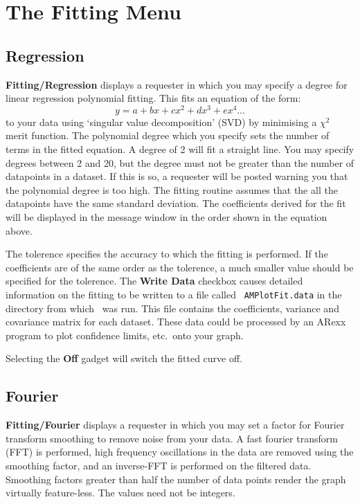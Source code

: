 \section{The Fitting Menu}


\subsection{Regression}
{\bf Fitting/Regression}  displays a requester in 
which you may specify a degree for linear regression polynomial fitting. 
This fits an equation of the form:
$$y=a+bx+cx^2+dx^3+ex^4\ldots$$
to your data using `singular value decomposition' (SVD) by minimising a $\chi^2$ 
merit function.
The polynomial degree which you specify sets the number of terms in 
the fitted equation. A degree of 2 will fit a straight line. You may specify 
degrees between 2 and 20, but the degree must not be greater than the number of 
datapoints in a dataset. If this is so, a requester will be posted warning you that 
the polynomial degree is too high.
The fitting routine assumes that the all the datapoints have the same
standard deviation. The coefficients derived for the fit will be displayed in the
message window in the order shown in the equation above.

The tolerence specifies the accuracy to which the fitting is performed. If 
the coefficients are of the same order as the tolerence, a much smaller 
value should be specified for the tolerence. The {\bf Write Data} checkbox 
causes detailed information on the fitting to be written to a file called 
{\tt
AMPlotFit.data} in the directory from which \amplot\ was run. This file contains the 
coefficients, variance and covariance matrix for each dataset. These data could be 
processed by an ARexx program to plot confidence limits, etc.\ onto your graph.

Selecting the {\bf Off} gadget will switch the fitted curve off.

\subsection{Fourier}
{\bf Fitting/Fourier}  
displays a requester in which you may set a 
factor for Fourier transform smoothing to remove noise from your data.
A fast fourier transform (FFT) is 
performed, high frequency oscillations in the data are removed using the smoothing 
factor, and an inverse-FFT is performed on the filtered data.
Smoothing factors greater 
than half the number of data points render the graph virtually feature-less.
The values need not be integers.


